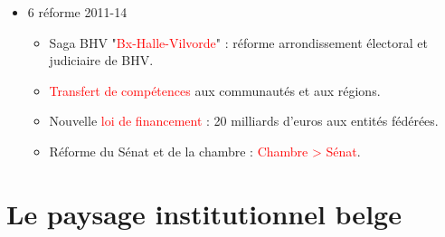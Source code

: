 \begin{itemize}
	\item 6 réforme 2011-14
	\begin{itemize}
		\item Saga BHV "\textcolor{red}{Bx-Halle-Vilvorde}" : réforme arrondissement électoral et judiciaire de BHV.
		\item \textcolor{red}{Transfert de compétences} aux communautés et aux régions.
		\item Nouvelle \textcolor{red}{loi de financement} : 20 milliards d'euros aux entités fédérées.
		\item Réforme du Sénat et de la chambre : \textcolor{red}{Chambre > Sénat}.
	\end{itemize}
\end{itemize}

\section{Le paysage institutionnel belge}
